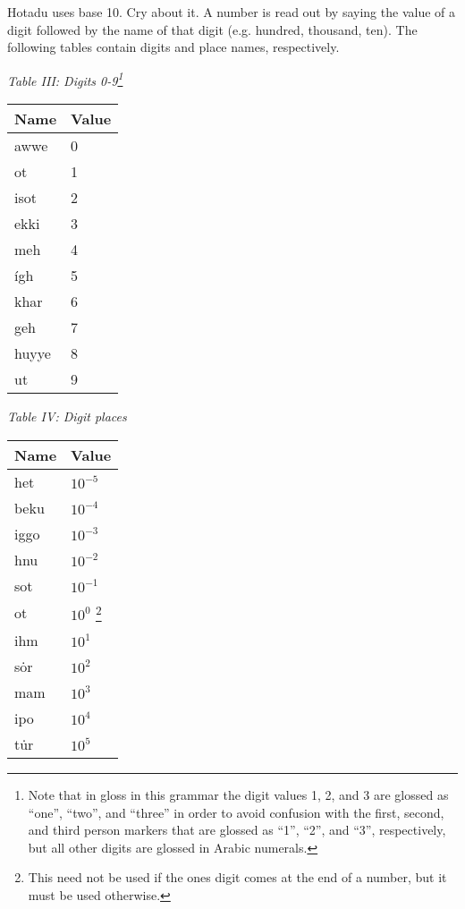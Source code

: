 \documentclass{article}[10pt]
\begin{document}
Hotadu uses base 10. Cry about it. A number is read out by saying the value of a digit followed by the name of that digit (e.g. hundred, thousand, ten). The following tables contain digits and place names, respectively.
\begin{center}
\emph{Table III: Digits 0-9\emph{\footnote{Note that in gloss in this grammar the digit values 1, 2, and 3 are glossed as ``one'', ``two'', and ``three'' in order to avoid confusion with the first, second, and third person markers that are glossed as ``1'', ``2'', and ``3'', respectively, but all other digits are glossed in Arabic numerals.}}}\\
\begin{tabularx}{0.5\textwidth}{ |X|X| }
\hline
{\bf Name} & \bf{Value} \\ \hline
 awwe & 0 \\ \hline
 ot & 1 \\ \hline
 isot & 2 \\ \hline
 ekki & 3 \\ \hline
 meh & 4 \\ \hline
 \'{i}gh & 5 \\ \hline
 khar & 6 \\ \hline
 geh & 7 \\ \hline
 huyye & 8 \\ \hline
 ut & 9 \\ \hline
\end{tabularx}
\end{center}


\begin{center}
\emph{Table IV: Digit places}\\
\begin{tabularx}{0.5\textwidth}{ |X|X| }
\hline
{\bf Name} & \bf{Value} \\ \hline
 het & $10^{-5}$ \\ \hline
 beku & $10^{-4}$ \\ \hline
 iggo & $10^{-3}$ \\ \hline
 hnu & $10^{-2}$ \\ \hline
 sot & $10^{-1}$ \\ \hline
 ot & $10^{0}$ \footnote{This need not be used if the ones digit comes at the end of a number, but it must be used otherwise.} \\ \hline
 ihm & $10^1$ \\ \hline
 s\.{o}r & $10^2$ \\ \hline
 mam & $10^3$ \\ \hline
 ipo & $10^4$ \\ \hline
 t\.{u}r & $10^5$ \\ \hline
\end{tabularx}
\end{center}
\end{document}

